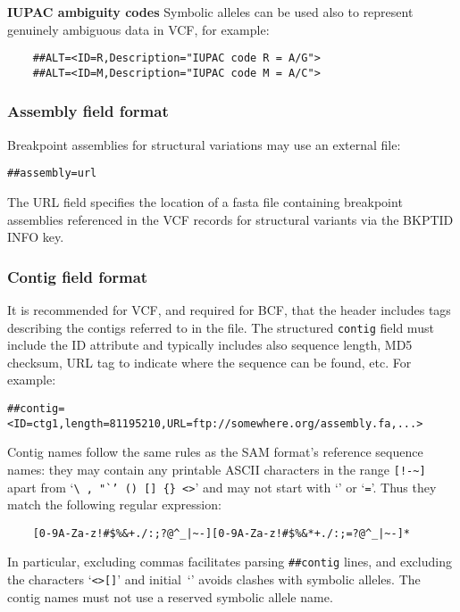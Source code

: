 \documentclass[8pt]{article}
\begin{document}
\bigskip

\noindent \textbf{IUPAC ambiguity codes} \newline
Symbolic alleles can be used also to represent genuinely ambiguous data in VCF, for example:
\begin{verbatim}
    ##ALT=<ID=R,Description="IUPAC code R = A/G">
    ##ALT=<ID=M,Description="IUPAC code M = A/C">
\end{verbatim}


\subsubsection{Assembly field format}
Breakpoint assemblies for structural variations may use an external file:
\begin{verbatim}
##assembly=url
\end{verbatim}

The URL field specifies the location of a fasta file containing breakpoint assemblies referenced in the VCF records for structural variants via the BKPTID INFO key.

\subsubsection{Contig field format}
\label{sec-contig-field}
It is recommended for VCF, and required for BCF, that the header includes tags describing the contigs referred to in the file.
The structured \texttt{contig} field must include the ID attribute and typically includes also sequence length, MD5 checksum, URL tag to indicate where the sequence can be found, etc.
For example:
\begin{verbatim}
##contig=<ID=ctg1,length=81195210,URL=ftp://somewhere.org/assembly.fa,...>
\end{verbatim}

\noindent
Contig names follow the same rules as the SAM format's reference sequence names:
they may contain any printable ASCII characters in the range \verb|[!-~]| apart from `{\tt\verb|\|\,,\,"`'\,()\,[]\,\verb|{}|\,<>}' and may not start with `{\tt *}' or `{\tt =}'.
Thus they match the following regular expression:
\begin{verbatim}
    [0-9A-Za-z!#$%&+./:;?@^_|~-][0-9A-Za-z!#$%&*+./:;=?@^_|~-]*
\end{verbatim}
\noindent
In particular, excluding commas facilitates parsing \verb|##contig| lines, and excluding the characters `\verb|<>[]|' and initial~`{\tt *}' avoids clashes with symbolic alleles.
The contig names must not use a reserved symbolic allele name.
\end{document}
